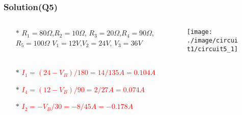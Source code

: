 \documentclass{beamer}
\newcommand{\red}[1]{\textcolor{red}{#1}}
\begin{document}
\begin{frame}
\frametitle{Solution(Q5)}
\begin{columns}
\begin{column}{5cm}
\begin{itemize} \itemsep1pt \parskip0pt 
  \item[$\ast$]  $R_1 = 80\Omega$,$R_2 = 10\Omega$,\newline
  $R_3 = 20\Omega$,$R_4 = 90\Omega$,\newline
  $R_5 = 100\Omega$ \newline
  $V_1 = 12V$,$V_2 = 24V$,\newline
  $V_3 = 36V$
\end{itemize}
\end{column}



\begin{column}{8cm}
\begin{figure}[H]
  \centering
  \texttt{[image: ./image/circuit1/circuit5\_1]}
\end{figure}
\end{column}
\end{columns}

\begin{itemize} \itemsep1pt \parskip0pt 
  \item[$\ast$] \red{$I_1 = (24 - V_B)/180 = 14/135A = 0.104A$}
  \item[$\ast$] \red{$I_4 = (12 - V_B)/90 = 2/27A = 0.074A$}
  \item[$\ast$] \red{$I_2 = -V_B/30 = -8/45A = -0.178A$}
\end{itemize}


\end{frame}

\end{document}
